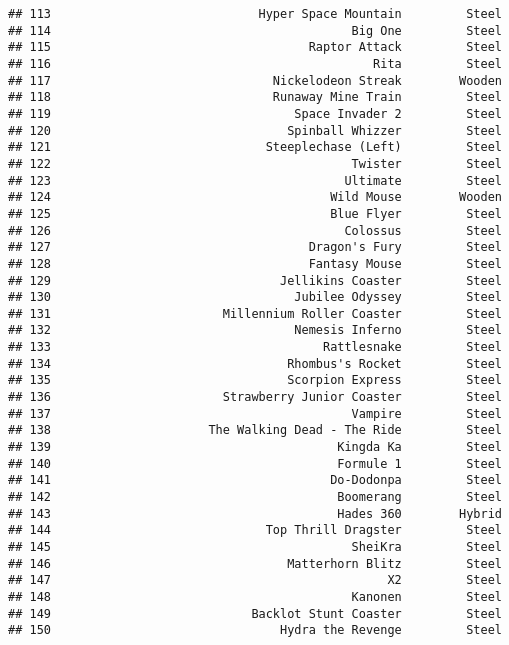 \documentclass[
]{article}
\begin{document}
\begin{verbatim}
## 113                             Hyper Space Mountain         Steel
## 114                                          Big One         Steel
## 115                                    Raptor Attack         Steel
## 116                                             Rita         Steel
## 117                               Nickelodeon Streak        Wooden
## 118                               Runaway Mine Train         Steel
## 119                                  Space Invader 2         Steel
## 120                                 Spinball Whizzer         Steel
## 121                              Steeplechase (Left)         Steel
## 122                                          Twister         Steel
## 123                                         Ultimate         Steel
## 124                                       Wild Mouse        Wooden
## 125                                       Blue Flyer         Steel
## 126                                         Colossus         Steel
## 127                                    Dragon's Fury         Steel
## 128                                    Fantasy Mouse         Steel
## 129                                Jellikins Coaster         Steel
## 130                                  Jubilee Odyssey         Steel
## 131                        Millennium Roller Coaster         Steel
## 132                                  Nemesis Inferno         Steel
## 133                                      Rattlesnake         Steel
## 134                                 Rhombus's Rocket         Steel
## 135                                 Scorpion Express         Steel
## 136                        Strawberry Junior Coaster         Steel
## 137                                          Vampire         Steel
## 138                      The Walking Dead - The Ride         Steel
## 139                                        Kingda Ka         Steel
## 140                                        Formule 1         Steel
## 141                                       Do-Dodonpa         Steel
## 142                                        Boomerang         Steel
## 143                                        Hades 360        Hybrid
## 144                              Top Thrill Dragster         Steel
## 145                                          SheiKra         Steel
## 146                                 Matterhorn Blitz         Steel
## 147                                               X2         Steel
## 148                                          Kanonen         Steel
## 149                            Backlot Stunt Coaster         Steel
## 150                                Hydra the Revenge         Steel

\end{verbatim}
\end{document}
